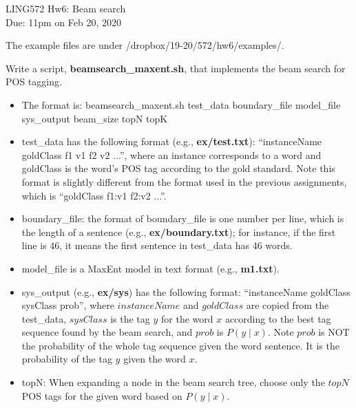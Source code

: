 \documentclass[11pt]{article}
\begin{document}
\begin{center}
\LARGE
LING572 Hw6: Beam search\\
Due: 11pm on Feb 20, 2020\\
\vspace{0.3in}
\end{center}


The example files are under /dropbox/19-20/572/hw6/examples/.


\vspace{0.4 in}

  Write a script, {\bf beamsearch\_maxent.sh}, that implements
  the beam search for POS tagging.

\begin{itemize}
  \item The format is: beamsearch\_maxent.sh test\_data boundary\_file model\_file sys\_output beam\_size topN topK

  \item test\_data has the following format (e.g., {\bf ex/test.txt}):
        ``instanceName goldClass f1 v1 f2 v2 ...'', where 
          an instance corresponds to a word and goldClass is
          the word's POS tag according to the gold standard. 
          Note this format is slightly different
         from the format used in the previous assignments, which is 
         ``goldClass f1:v1 f2:v2 ...''.

  \item boundary\_file: the format of boundary\_file is 
       one number per line, which is the length of a sentence
       (e.g., {\bf ex/boundary.txt}); for instance, if the first line
       is 46, it means the first sentence in test\_data has 46 words.
       
  \item model\_file is a MaxEnt model in text format (e.g., {\bf m1.txt}). 
 
  \item sys\_output (e.g., {\bf ex/sys}) has the following format: 
         ``instanceName goldClass sysClass prob'', where 
         $instanceName$ and $goldClass$ are copied from the test\_data, 
         $sysClass$ is the tag $y$ for the word $x$ according to the best 
         tag sequence found by the beam search, 
         and $prob$ is $P(y \mid x)$. Note $prob$ is NOT the probability 
         of the whole tag sequence given the word sentence. It is the
         probability of the tag $y$ given the word $x$.

  \item topN: When expanding a node 
        in the beam search tree, choose only the 
        $topN$ POS tags for the given word based on 
        $P(y \mid x)$.


\end{itemize}
\end{document}
